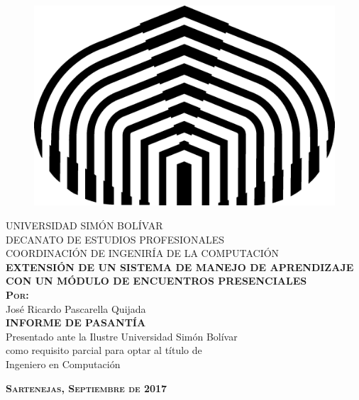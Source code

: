 \begin{titlepage}
\begin{center}

\begin{figure}[h]
\begin{center}
\includegraphics{Logos/logoUSB.png}
\end{center}
\end{figure}

\textsc{UNIVERSIDAD SIMÓN BOLÍVAR}\\
\textsc{DECANATO DE ESTUDIOS PROFESIONALES}\\
\textsc{COORDINACIÓN DE INGENIRÍA DE LA COMPUTACIÓN}\\[8em]

\textsc{\Large \textbf{EXTENSIÓN DE UN SISTEMA DE MANEJO DE APRENDIZAJE CON UN MÓDULO DE ENCUENTROS PRESENCIALES}}\\[4em]

\textsc{ \textbf{Por:} }\\
José Ricardo Pascarella Quijada\\[4em]

\textsc{ \textbf{INFORME DE PASANTÍA} }\\
Presentado ante la Ilustre Universidad Simón Bolívar\\
como requisito parcial para optar al título de \\
Ingeniero en Computación

\vspace*{\fill}

\textsc{ \textbf{Sartenejas, Septiembre de 2017} }
\end{center}
\end{titlepage}